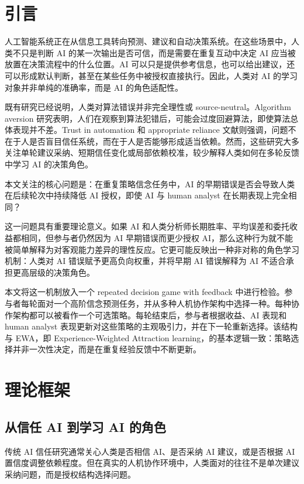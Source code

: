 \documentclass[12pt]{article}
\begin{document}
\section{引言}

人工智能系统正在从信息工具转向预测、建议和自动决策系统。在这些场景中，人类不只是判断 AI 的某一次输出是否可信，而是需要在重复互动中决定 AI 应当被放置在决策流程中的什么位置。AI 可以只是提供参考信息，也可以给出建议，还可以形成默认判断，甚至在某些任务中被授权直接执行。因此，人类对 AI 的学习对象并非单纯的准确率，而是 AI 的角色适配性。

既有研究已经说明，人类对算法错误并非完全理性或 source-neutral。Algorithm aversion 研究表明，人们在观察到算法犯错后，可能会过度回避算法，即使算法总体表现并不差。Trust in automation 和 appropriate reliance 文献则强调，问题不在于人是否盲目信任系统，而在于人是否能够形成适当依赖。然而，这些研究大多关注单轮建议采纳、短期信任变化或局部依赖校准，较少解释人类如何在多轮反馈中学习 AI 的决策角色。

本文关注的核心问题是：在重复策略信念任务中，AI 的早期错误是否会导致人类在后续轮次中持续降低 AI 授权，即使 AI 与 human analyst 在长期表现上完全相同？

这一问题具有重要理论意义。如果 AI 和人类分析师长期胜率、平均误差和委托收益都相同，但参与者仍然因为 AI 早期错误而更少授权 AI，那么这种行为就不能被简单解释为对客观能力差异的理性反应。它更可能反映出一种非对称的角色学习机制：人类对 AI 错误赋予更高负向权重，并将早期 AI 错误解释为 AI 不适合承担更高层级的决策角色。

本文将这一机制放入一个 repeated decision game with feedback 中进行检验。参与者每轮面对一个高阶信念预测任务，并从多种人机协作架构中选择一种。每种协作架构都可以被看作一个可选策略。每轮结束后，参与者根据收益、AI 表现和 human analyst 表现更新对这些策略的主观吸引力，并在下一轮重新选择。该结构与 EWA，即 Experience-Weighted Attraction learning，的基本逻辑一致：策略选择并非一次性决定，而是在重复经验反馈中不断更新。

\section{理论框架}

\subsection{从信任 AI 到学习 AI 的角色}

传统 AI 信任研究通常关心人类是否相信 AI、是否采纳 AI 建议，或是否根据 AI 置信度调整依赖程度。但在真实的人机协作环境中，人类面对的往往不是单次建议采纳问题，而是授权结构选择问题。
\end{document}
